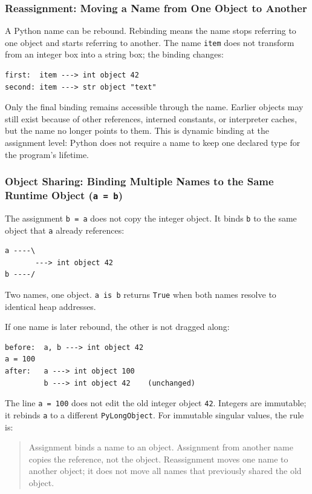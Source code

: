 \subsubsection{Reassignment: Moving a Name from One Object to Another}

A Python name can be rebound. Rebinding means the name stops referring to one object and starts referring to another. The name \texttt{item} does not transform from an integer box into a string box; the binding changes:

\begin{verbatim}
first:  item ---> int object 42
second: item ---> str object "text"
\end{verbatim}

Only the final binding remains accessible through the name. Earlier objects may still exist because of other references, interned constants, or interpreter caches, but the name no longer points to them. This is dynamic binding at the assignment level: Python does not require a name to keep one declared type for the program's lifetime.

\subsubsection{Object Sharing: Binding Multiple Names to the Same Runtime Object (\texttt{a = b})}

The assignment \texttt{b = a} does not copy the integer object. It binds \texttt{b} to the same object that \texttt{a} already references:

\begin{verbatim}
a ----\
       ---> int object 42
b ----/
\end{verbatim}

Two names, one object. \texttt{a is b} returns \texttt{True} when both names resolve to identical heap addresses.

If one name is later rebound, the other is not dragged along:

\begin{verbatim}
before:  a, b ---> int object 42
a = 100
after:   a ---> int object 100
         b ---> int object 42    (unchanged)
\end{verbatim}

The line \texttt{a = 100} does not edit the old integer object \texttt{42}. Integers are immutable; it rebinds \texttt{a} to a different \texttt{PyLongObject}. For immutable singular values, the rule is:

\begin{quote}
Assignment binds a name to an object. Assignment from another name copies the reference, not the object. Reassignment moves one name to another object; it does not move all names that previously shared the old object.
\end{quote}
